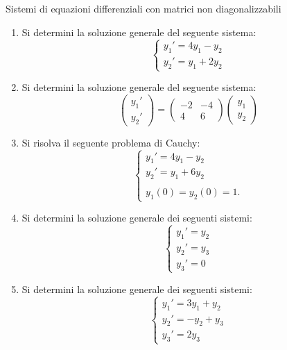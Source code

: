 \thispagestyle{empty}

\centerline{\Large Sistemi di equazioni differenziali con matrici non diagonalizzabili}
\bigskip\bigskip

\begin{enumerate}
\item Si determini la soluzione generale del seguente sistema:
$$\left\{\begin{array}{l}
y_1'=4y_1-y_2\\
y_2'=y_1+2y_2
\end{array}\right.$$
\item Si determini la soluzione generale del seguente sistema:
$$\left(\begin{array}{l}
y_1'\\ y_2'
\end{array}\right)=
\left(\begin{array}{cc}
-2 & -4 \\
4 & 6
\end{array}\right)
\left(\begin{array}{l}
y_1\\ y_2
\end{array}\right)$$
\item Si risolva il seguente problema di Cauchy:
 $$\left\{\begin{array}{l}
y_1'=4y_1-y_2\\
y_2'=y_1+6y_2\\
\\
y_1(0)=y_2(0)=1.
\end{array}\right.$$
\item Si determini la soluzione generale dei seguenti sistemi:
$$\left\{
\begin{array}{l} 
y_1'=y_2\\ 
y_2'=y_3\\
y_3'=0
\end{array}
\right.
$$
\item Si determini la soluzione generale dei seguenti sistemi:
$$\left\{
\begin{array}{l} 
y_1'=3y_1+y_2\\ 
y_2'=-y_2+y_3\\
y_3'=2y_3
\end{array}
\right.
$$

\end{enumerate}

